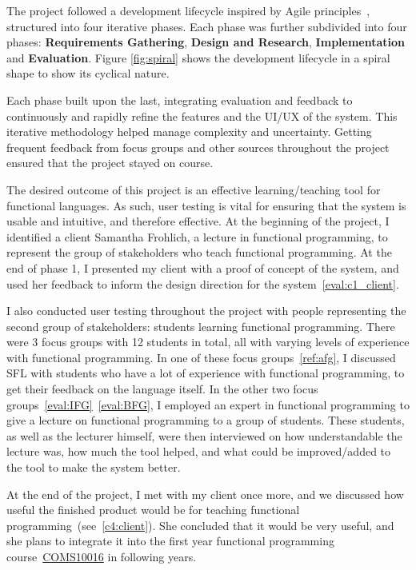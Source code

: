 The project followed a development lifecycle inspired by Agile principles~\cite{agilemanifesto2001}, structured into four iterative phases. 
Each phase was further subdivided into four phases: \textbf{Requirements Gathering}, \textbf{Design and Research}, \textbf{Implementation} and \textbf{Evaluation}. Figure \ref{fig:spiral} shows the development lifecycle in a spiral shape to show its cyclical nature. 

Each phase built upon the last, integrating evaluation and feedback to continuously and rapidly refine the features and the UI/UX of the system. This iterative methodology helped manage complexity and uncertainty. Getting frequent feedback from focus groups and other sources throughout the project ensured that the project stayed on course. 

The desired outcome of this project is an effective learning/teaching tool for functional languages. As such, user testing is vital for ensuring that the system is usable and intuitive, and therefore effective. At the beginning of the project, I identified a client Samantha Frohlich, a lecture in functional programming, to represent the group of stakeholders who teach functional programming. At the end of phase 1, I presented my client with a proof of concept of the system, and used her feedback to inform the design direction for the system~\ref{eval:c1_client}. 

I also conducted user testing throughout the project with people representing the second group of stakeholders: students learning functional programming. There were 3 focus groups with 12 students in total, all with varying levels of experience with functional programming. In one of these focus groups~\ref{ref:afg}, I discussed \ac{SFL} with students who have a lot of experience with functional programming, to get their feedback on the language itself. In the other two focus groups~\ref{eval:IFG}~\ref{eval:BFG}, I employed an expert in functional programming to give a lecture on functional programming to a group of students. These students, as well as the lecturer himself, were then interviewed on how understandable the lecture was, how much the tool helped, and what could be improved/added to the tool to make the system better. 

At the end of the project, I met with my client once more, and we discussed how useful the finished product would be for teaching functional programming~(see~\ref{c4:client}). She concluded that it would be very useful, and she plans to integrate it into the first year functional programming course~\hyperref[COMS10016]{COMS10016} in following years. 
